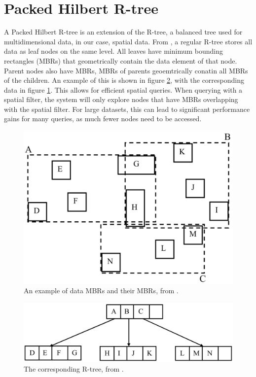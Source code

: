 \section{Packed Hilbert R-tree}
\label{sec:rtree}
A Packed Hilbert R-tree is an extension of the R-tree, a balanced tree used for multidimensional data, in our case, spatial data. From \cite{rtree}, a regular R-tree stores all data as leaf nodes on the same level. All leaves have minimum bounding rectangles (MBRs) that geometrically contain the data element of that node. Parent nodes also have MBRs, MBRs of parents geoemtrically conatin all MBRs of the children. An example of this is shown in figure \ref{fig:rtree}, with the corresponding data in figure \ref{fig:mbrs}. This allows for efficient spatial queries. When querying with a spatial filter, the system will only explore nodes that have MBRs overlapping with the spatial filter. For large datasets, this can lead to significant performance gains for many queries, as much fewer nodes need to be accessed.

\begin{figure}
    \centering
    \includegraphics[width=0.5\linewidth]{./figures/mbrs.png}
    \caption{An example of data MBRs and their MBRs, from \cite{rtree}.}
    \label{fig:mbrs}
\end{figure}
\begin{figure}
    \centering
    \includegraphics[width=\linewidth]{./figures/rtree.png}
    \caption{The corresponding R-tree, from \cite{rtree}.}
    \label{fig:rtree}
\end{figure}

